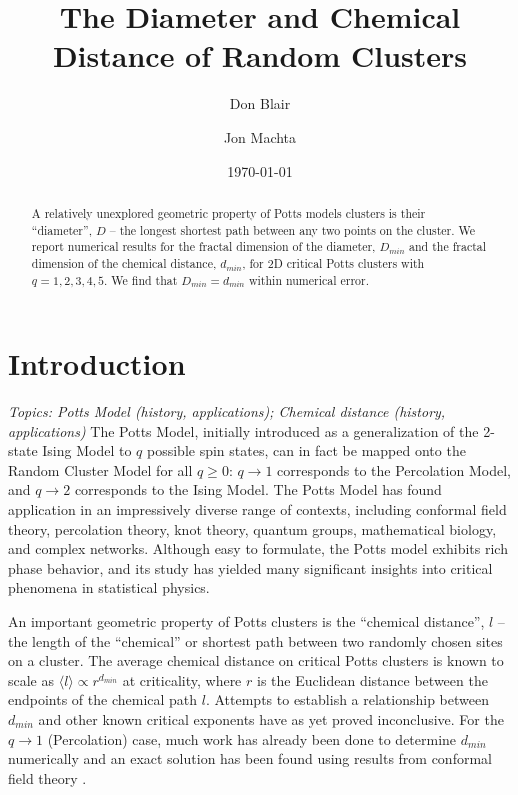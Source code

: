 \documentclass[pre,preprint]{revtex4}
\begin{document}
\title{The Diameter and Chemical Distance of Random Clusters}

\author{Don Blair}
\author{Jon Machta}

\date{\today}


\begin{abstract}
 A relatively unexplored geometric property of Potts models clusters is their ``diameter'', $D$ -- the longest shortest path between any two points on the cluster. We report numerical results for the fractal dimension of the diameter, $D_{min}$ and the fractal dimension of the chemical distance, $d_{min}$, for 2D critical Potts clusters with $q=1,2,3,4,5$. We find that $D_{min} = d_{min}$ within numerical error.
\end{abstract}

\maketitle 

\section{Introduction} %

{\it Topics: Potts Model (history, applications);  Chemical distance (history, applications)}
The Potts Model, initially introduced as a generalization of the 2-state Ising Model to $q$ possible spin states, can in fact be mapped onto the Random Cluster Model for all $q \ge 0$: $q \to 1$ corresponds to the Percolation Model, and $q \to 2$ corresponds to the Ising Model.  The Potts Model has found application in an impressively diverse range of contexts, including conformal field theory, percolation theory, knot theory, quantum groups, mathematical biology, and complex networks. Although easy to formulate, the Potts model exhibits rich phase behavior, and its study has yielded many significant insights into critical phenomena in statistical physics.

An important geometric property of Potts clusters is the ``chemical distance'', $l$ -- the length of the ``chemical'' or shortest path between two randomly chosen sites on a cluster.  The average chemical distance on critical Potts clusters is known to scale as $\langle l \rangle \propto r^{d_{min}}$ at criticality, where $r$ is the Euclidean distance between the endpoints of the chemical path $l$. Attempts to establish a relationship between $d_{min}$ and other known critical exponents have as yet proved inconclusive.  For the $q \to 1$ (Percolation) case, much work has already been done to determine $d_{min}$ numerically \cite{Gr83, HrSt88} and an exact solution has been found using results from conformal field theory \cite{Zi99}.
\end{document}
